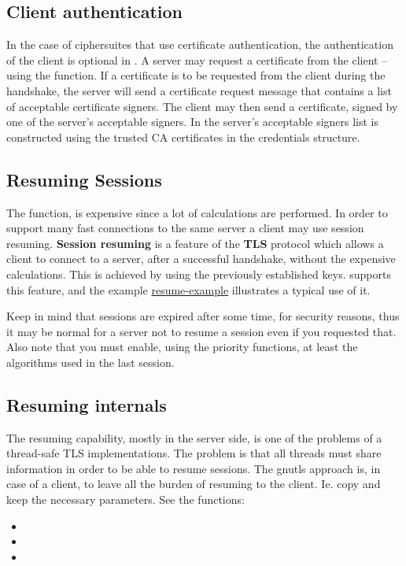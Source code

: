 \subsection{Client authentication}
In the case of ciphersuites that use certificate authentication, the
authentication of the client is
optional in \tls{}. A server may request a certificate from the client -- using the
function. If a certificate is to be requested from the client during the handshake,
the server will send a certificate request message that contains
a list of acceptable certificate signers. The client may then send a certificate, signed
by one of the server's acceptable signers. In \gnutls{} the server's acceptable
signers list is constructed using the trusted CA certificates in the
credentials structure.

\subsection{Resuming Sessions}
\label{resume}
\par
The 
 function, is expensive since a lot of calculations are performed. In order to support many fast connections to
the same server a client may use session resuming. {\bf Session resuming} is a
feature of the {\bf TLS} protocol which allows a client to connect to a server,
after a successful handshake, without the expensive calculations. This is
achieved by using the previously
established keys. \gnutls{} supports this feature, and the
example \hyperref{resume client}{resume client (see section }{)}{resume-example} illustrates a typical use of it.
\par
Keep in mind that sessions are expired after some time, for security reasons, thus
it may be normal for a server not to resume a session even if you requested that.
Also note that you must enable, using the priority functions, at least the
algorithms used in the last session.

\subsection{Resuming internals}
The resuming capability, mostly in the server side, is one of the problems of a thread-safe TLS
implementations. The problem is that all threads must share information in
order to be able to resume sessions. The gnutls approach is, in case of a
client, to leave all the burden of resuming to the client. Ie. copy and keep the
necessary parameters. See the functions:
\begin{itemize}
\item {}
\item {}
\item {}
\end{itemize}

